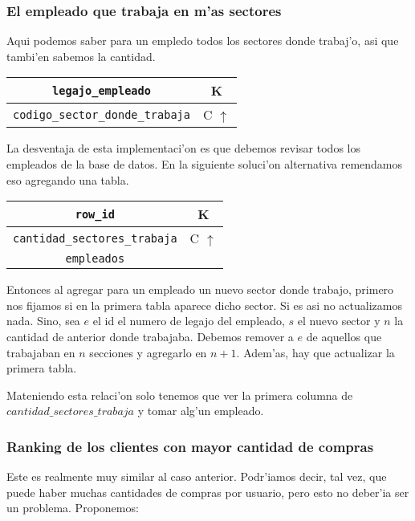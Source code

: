 \subsubsection{El empleado que trabaja en m'as sectores}

Aqui podemos saber para un empledo todos los sectores donde trabaj'o, asi que tambi'en sabemos la cantidad.

\begin{center}
\begin{tabular}{|c|c|}
\hline
\texttt{legajo\_empleado} & K\\
\hline
\texttt{codigo\_sector\_donde\_trabaja} & C $\uparrow$\\
\hline
\end{tabular}
\end{center}

La desventaja de esta implementaci'on es que debemos revisar todos los empleados de la base de datos. En la siguiente soluci'on alternativa remendamos eso agregando una tabla.

\begin{center}
\begin{tabular}{|c|c|}
\hline
\texttt{row\_id} & K\\
\hline
\texttt{cantidad\_sectores\_trabaja} & C $\uparrow$\\
\hline
\texttt{empleados} & \\
\hline
\end{tabular}
\end{center}

Entonces al agregar para un empleado un nuevo sector donde trabajo, primero nos fijamos si en la primera tabla aparece dicho sector. Si es asi no actualizamos nada. Sino, sea $e$ el id el numero de legajo del empleado, $s$ el nuevo sector y $n$ la cantidad de anterior donde trabajaba.
Debemos remover a $e$ de aquellos que trabajaban en $n$ secciones y agregarlo en $n + 1$. Adem'as, hay que actualizar la primera tabla.

Mateniendo esta relaci'on solo tenemos que ver la primera columna de $cantidad\_sectores\_trabaja$ y tomar alg'un empleado.

\subsubsection{Ranking de los clientes con mayor cantidad de compras}

Este es realmente muy similar al caso anterior. Podr'iamos decir, tal vez, que puede haber muchas cantidades de compras por usuario, pero esto no deber'ia ser un problema. Proponemos:

